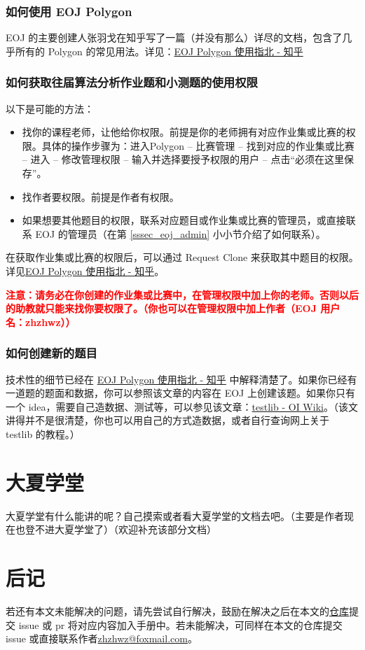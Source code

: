 \documentclass{article}
\begin{document}
\subsubsection{如何使用 EOJ Polygon}

EOJ 的主要创建人张羽戈在知乎写了一篇（并没有那么）详尽的文档，包含了几乎所有的 Polygon 的常见用法。详见：\href{https://zhuanlan.zhihu.com/p/59869879}{EOJ Polygon 使用指北 - 知乎}

\subsubsection{如何获取往届算法分析作业题和小测题的使用权限}

以下是可能的方法：

\begin{itemize}
    \item 找你的课程老师，让他给你权限。前提是你的老师拥有对应作业集或比赛的权限。具体的操作步骤为：进入Polygon -- 比赛管理 -- 找到对应的作业集或比赛 -- 进入 -- 修改管理权限 -- 输入并选择要授予权限的用户 -- 点击``必须在这里保存''。
    \item 找作者要权限。前提是作者有权限。
    \item 如果想要其他题目的权限，联系对应题目或作业集或比赛的管理员，或直接联系 EOJ 的管理员（在第 \ref{sssec_eoj_admin} 小小节介绍了如何联系）。
\end{itemize}

在获取作业集或比赛的权限后，可以通过 Request Clone 来获取其中题目的权限。详见\href{https://zhuanlan.zhihu.com/p/59869879}{EOJ Polygon 使用指北 - 知乎}。

\textbf{\textcolor{red}{注意：请务必在你创建的作业集或比赛中，在管理权限中加上你的老师。否则以后的助教就只能来找你要权限了。（你也可以在管理权限中加上作者（EOJ 用户名：zhzhwz））}}

\subsubsection{如何创建新的题目}

技术性的细节已经在 \href{https://zhuanlan.zhihu.com/p/59869879}{EOJ Polygon 使用指北 - 知乎} 中解释清楚了。如果你已经有一道题的题面和数据，你可以参照该文章的内容在 EOJ 上创建该题。如果你只有一个 idea，需要自己造数据、测试等，可以参见该文章：\href{https://oi-wiki.org/tools/testlib/}{testlib - OI Wiki}。（该文讲得并不是很清楚，你也可以用自己的方式造数据，或者自行查询网上关于 testlib 的教程。）

\section{大夏学堂}

大夏学堂有什么能讲的呢？自己摸索或者看大夏学堂的文档去吧。（主要是作者现在也登不进大夏学堂了）（欢迎补充该部分文档）

\section{后记}

若还有本文未能解决的问题，请先尝试自行解决，鼓励在解决之后在本文的\href{https://github.com/zhzhwz/AlgorithmTAManual}{仓库}提交 issue 或 pr 将对应内容加入手册中。若未能解决，可同样在本文的仓库提交 issue 或直接联系作者\href{mailto:zhzhwz@foxmail.com}{zhzhwz@foxmail.com}。 
\end{document}
